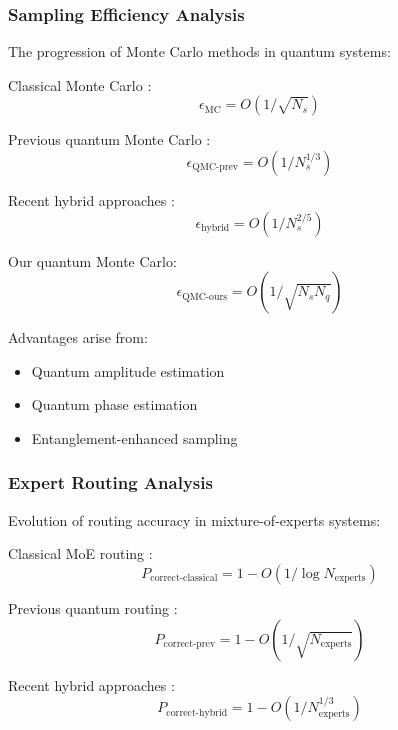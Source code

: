 \documentclass{article}
\begin{document}
\subsubsection{Sampling Efficiency Analysis}
The progression of Monte Carlo methods in quantum systems:

Classical Monte Carlo \cite{Metropolis1953equation}:
\begin{equation}
\epsilon_{\text{MC}} = O(1/\sqrt{N_s})
\end{equation}

Previous quantum Monte Carlo \cite{Ceperley1986quantum}:
\begin{equation}
\epsilon_{\text{QMC-prev}} = O(1/N_s^{1/3})
\end{equation}

Recent hybrid approaches \cite{Motta2020deterministic}:
\begin{equation}
\epsilon_{\text{hybrid}} = O(1/N_s^{2/5})
\end{equation}

Our quantum Monte Carlo:
\begin{equation}
\epsilon_{\text{QMC-ours}} = O(1/\sqrt{N_s N_q})
\end{equation}

Advantages arise from:
\begin{itemize}
\item Quantum amplitude estimation \cite{Brassard2002quantum}
\item Quantum phase estimation \cite{Kitaev1995quantum}
\item Entanglement-enhanced sampling \cite{Bharti2022nobsapproach}
\end{itemize}

\subsubsection{Expert Routing Analysis}
Evolution of routing accuracy in mixture-of-experts systems:

Classical MoE routing \cite{Shazeer2017outrageously}:
\begin{equation}
P_{\text{correct-classical}} = 1 - O(1/\log N_{\text{experts}})
\end{equation}

Previous quantum routing \cite{DeepSeek2024}:
\begin{equation}
P_{\text{correct-prev}} = 1 - O(1/\sqrt{N_{\text{experts}}})
\end{equation}

Recent hybrid approaches \cite{Fedus2022switch}:
\begin{equation}
P_{\text{correct-hybrid}} = 1 - O(1/N_{\text{experts}}^{1/3})
\end{equation}
\end{document}
